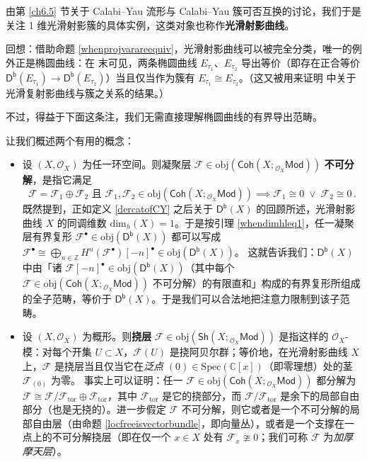 由第 \ref{ch6.5} 节关于 Calabi--Yau 流形与 Calabi--Yau 簇可否互换的讨论，我们于是关注 1 维光滑射影簇的具体实例，这类对象也称作\textbf{光滑射影曲线}。

回想：借助命题 \ref{whenprojvarareequiv}，光滑射影曲线可以被完全分类，唯一的例外正是椭圆曲线：在 \cite[第 5 章]{[Huy06]} 末可见，两条椭圆曲线 $E_{\tau_1}$、$E_{\tau_2}$ 导出等价（即存在正合等价 $\mathsf{D^b}(E_{\tau_1})\rightarrow\mathsf{D^b}(E_{\tau_2})$）当且仅当作为簇有 $E_{\tau_1}\cong E_{\tau_2}$。（这又被用来证明 \cite[推论 5.46]{[Huy06]} 中关于光滑复射影曲线与簇之关系的结果。）

不过，得益于下面这条注，我们无需直接理解椭圆曲线的有界导出范畴。

\begin{Rem}\label{indecomposabletorsion}
	让我们概述两个有用的概念：
	\begin{itemize}[leftmargin=0.5cm]
		\item 设 $(X,\mathcal{O}_X)$ 为任一环空间。则凝聚层 $\mathcal{F}\in\text{obj}(\mathsf{Coh}(X;{}_{\mathcal{O}_X}\!\mathsf{Mod}))$ \textbf{不可分解}，是指它满足
		\[
		\mathcal{F}=\mathcal{F}_1\oplus\mathcal{F}_2\text{ 且 }\mathcal{F}_1,\mathcal{F}_2\in\text{obj}(\mathsf{Coh}(X;{}_{\mathcal{O}_X}\!\mathsf{Mod}))\implies\mathcal{F}_1\cong 0\;\vee\;\mathcal{F}_2\cong 0\,.
		\]
		既然提到，正如定义 \ref{dercatofCY} 之后关于 $\mathsf{D^b}(X)$ 的回顾所述，光滑射影曲线 $X$ 的同调维数 $\text{dim}_h(X)=1$。于是按引理 \ref{whendimhleq1}，任一凝聚层有界复形 $\mathcal{F}^\bullet\in\text{obj}(\mathsf{D^b}(X))$ 都可以写成 $\mathcal{F}^\bullet\cong\bigoplus_{n\in\mathbb{Z}} H^n(\mathcal{F}^\bullet)[-n]^\bullet\in\text{obj}(\mathsf{D^b}(X))$。
		\newline 这就告诉我们：$\mathsf{D^b}(X)$ 中由「诸 $\mathcal{F}[-n]^\bullet\in\text{obj}(\mathsf{D^b}(X))$（其中每个 $\mathcal{F}\in\text{obj}(\mathsf{Coh}(X;{}_{\mathcal{O}_X}\!\mathsf{Mod}))$ 不可分解）的有限直和」构成的有界复形所组成的全子范畴，等价于 $\mathsf{D^b}(X)$。于是我们可以合法地把注意力限制到该子范畴。

		\item 设 $(X,\mathcal{O}_X)$ 为概形。则\textbf{挠层} $\mathcal{F}\in\text{obj}(\mathsf{Sh}(X;{}_{\mathcal{O}_X}\!\mathsf{Mod}))$ 是指这样的 $\mathcal{O}_X$-模：对每个开集 $U\subset X$，$\mathcal{F}(U)$ 是挠阿贝尔群；等价地，在光滑射影曲线 $X$ 上，$\mathcal{F}$ 是挠层当且仅当它在\textit{泛点} $(0)\in\text{Spec}(\mathbb{C}[x])$（即零理想）处的茎 $\mathcal{F}_{(0)}$ 为零。
		\newline 事实上可以证明：任一 $\mathcal{F}\in\text{obj}(\mathsf{Coh}(X;{}_{\mathcal{O}_X}\!\mathsf{Mod}))$ 都分解为 $\mathcal{F}\cong\mathcal{F}/\mathcal{F}_\text{tor}\oplus\mathcal{F}_\text{tor}$，其中 $\mathcal{F}_\text{tor}$ 是它的挠部分，而 $\mathcal{F}/\mathcal{F}_\text{tor}$ 是余下的局部自由部分（也是无挠的）。进一步假定 $\mathcal{F}$ 不可分解，则它或者是一个不可分解的局部自由层（由命题 \ref{locfreeisvectorbundle}，即向量丛），或者是一个支撑在一点上的不可分解挠层（即在仅一个 $x\in X$ 处有 $\mathcal{F}_x\ncong 0$；我们可称 $\mathcal{F}$ 为\textit{加厚摩天层}）。
	\end{itemize}
\end{Rem}

